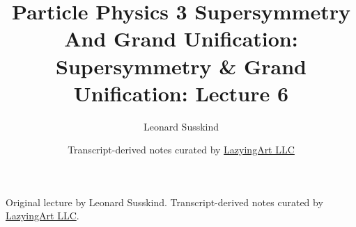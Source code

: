 \documentclass[11pt,oneside]{book}
\begin{document}
\frontmatter
\title{Particle Physics 3 Supersymmetry And Grand Unification: Supersymmetry \& Grand Unification: Lecture 6}
\author{Leonard Susskind}
\date{Transcript-derived notes curated by \href{https://lazying.art}{LazyingArt LLC}}
\maketitle
\begin{center}
\small Original lecture by Leonard Susskind. Transcript-derived notes curated by \href{https://lazying.art}{LazyingArt LLC}.
\end{center}
\clearpage
\mainmatter

\end{document}
